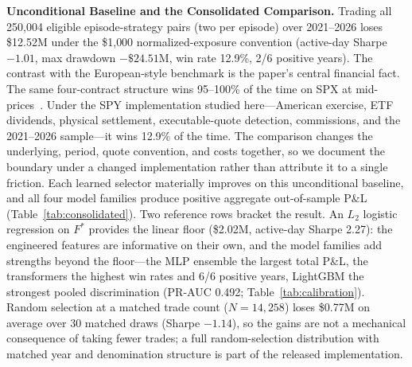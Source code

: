 \documentclass[sigconf,review]{acmart}
\begin{document}
\medskip\noindent\textbf{Unconditional Baseline and the Consolidated Comparison.}
Trading all 250{,}004 eligible episode-strategy pairs (two per episode) over 2021--2026 loses \$12.52M under the \$1{,}000 normalized-exposure convention (active-day Sharpe $-1.01$, max drawdown $-\$24.51$M, win rate 12.9\%, 2/6 positive years). The contrast with the European-style benchmark is the paper's central financial fact. The same four-contract structure wins 95--100\% of the time on SPX at mid-prices~\cite{glasserman2025tp2}. Under the SPY implementation studied here---American exercise, ETF dividends, physical settlement, executable-quote detection, commissions, and the 2021--2026 sample---it wins 12.9\% of the time. The comparison changes the underlying, period, quote convention, and costs together, so we document the boundary under a changed implementation rather than attribute it to a single friction. Each learned selector materially improves on this unconditional baseline, and all four model families produce positive aggregate out-of-sample P\&L (Table~\ref{tab:consolidated}). Two reference rows bracket the result. An $L_2$ logistic regression on $F^{\ast}$ provides the linear floor (\$2.02M, active-day Sharpe 2.27): the engineered features are informative on their own, and the model families add strengths beyond the floor---the MLP ensemble the largest total P\&L, the transformers the highest win rates and 6/6 positive years, LightGBM the strongest pooled discrimination (PR-AUC 0.492; Table~\ref{tab:calibration}). Random selection at a matched trade count ($N=14{,}258$) loses \$0.77M on average over 30 matched draws (Sharpe $-1.14$), so the gains are not a mechanical consequence of taking fewer trades; a full random-selection distribution with matched year and denomination structure is part of the released implementation.
\end{document}
